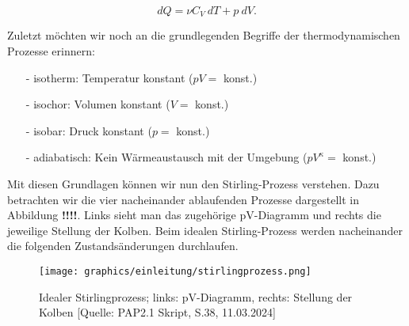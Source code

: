 \documentclass{article}
\begin{document}
\begin{equation}
    dQ = \nu C_V \ dT + p \ dV.
\end{equation}

Zuletzt möchten wir noch an die grundlegenden Begriffe der thermodynamischen Prozesse erinnern:

\begin{itemize}
    \item[-] isotherm: Temperatur konstant ($pV =$ konst.)
    \item[-] isochor: Volumen konstant ($V =$ konst.)
    \item[-] isobar: Druck konstant ($p =$ konst.)
    \item[-] adiabatisch: Kein Wärmeaustausch mit der Umgebung ($pV^\kappa =$ konst.)
\end{itemize}

Mit diesen Grundlagen können wir nun den Stirling-Prozess verstehen. Dazu betrachten wir die vier nacheinander ablaufenden Prozesse dargestellt in Abbildung \textbf{!!!!}. Links sieht man das zugehörige pV-Diagramm und rechts die jeweilige Stellung der Kolben. Beim idealen Stirling-Prozess werden nacheinander die folgenden Zustandsänderungen durchlaufen.

\begin{figure}[!h]
    \centering
    \texttt{[image: graphics/einleitung/stirlingprozess.png]}
    \caption{Idealer Stirlingprozess; links: pV-Diagramm, rechts: Stellung der Kolben [Quelle: PAP2.1 Skript, S.38, 11.03.2024]}
    \label{fig:schema_beta}
\end{figure}
\end{document}
